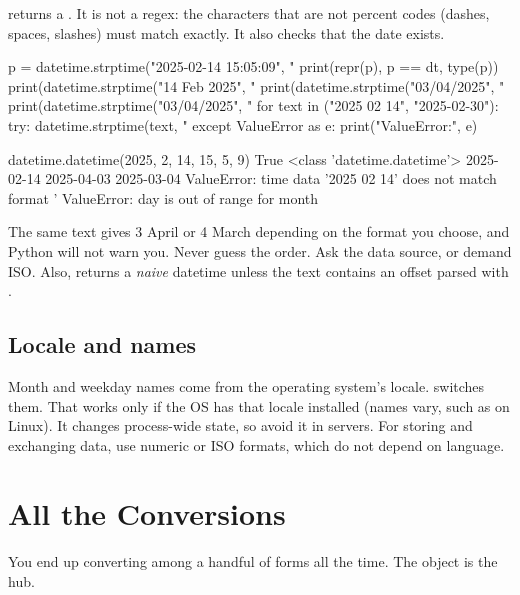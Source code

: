  returns a . It is not a regex: the characters
that are not percent codes (dashes, spaces, slashes) must match exactly. It also checks that the
date exists.

\begin{pycode}
p = datetime.strptime("2025-02-14 15:05:09", "%
print(repr(p), p == dt, type(p))
print(datetime.strptime("14 Feb 2025", "%
print(datetime.strptime("03/04/2025", "%
print(datetime.strptime("03/04/2025", "%
for text in ("2025 02 14", "2025-02-30"):
    try:
        datetime.strptime(text, "%
    except ValueError as e:
        print("ValueError:", e)
\end{pycode}
\begin{rawcode}
datetime.datetime(2025, 2, 14, 15, 5, 9) True <class 'datetime.datetime'>
2025-02-14
2025-04-03
2025-03-04
ValueError: time data '2025 02 14' does not match format '%
ValueError: day is out of range for month
\end{rawcode}

\begin{trap}
The same text  gives 3 April or 4 March depending on the format you choose, and
Python will not warn you. Never guess the order. Ask the data source, or demand ISO. Also,
 returns a \emph{naive} datetime unless the text contains an offset parsed with
.
\end{trap}

\subsection{Locale and names}

Month and weekday names come from the operating system's locale. 
switches them. That works only if the OS has that locale installed (names vary, such as
 on Linux). It changes process-wide state, so avoid it in servers. For storing
and exchanging data, use numeric or ISO formats, which do not depend on language.

\section{All the Conversions}

You end up converting among a handful of forms all the time. The  object is the hub.

